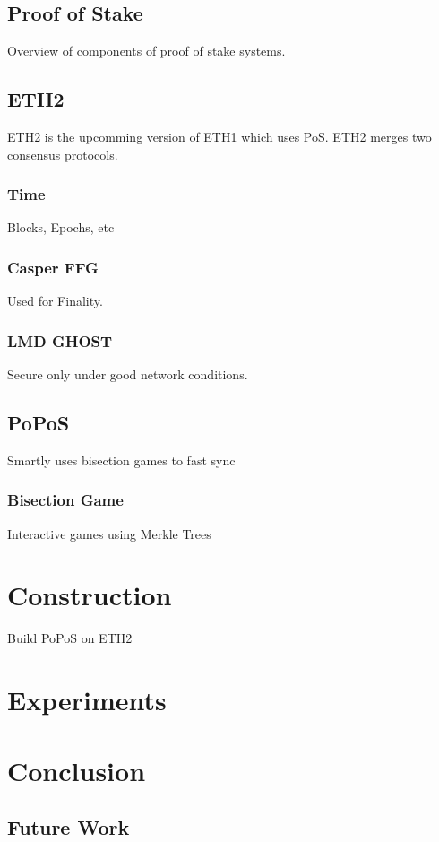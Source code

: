 \documentclass[runningheads]{llncs}
\begin{document}
\subsection{Proof of Stake}
Overview of components of proof of stake systems.

\subsection{ETH2}
ETH2 is the upcomming version of ETH1 which uses PoS. ETH2 merges two consensus protocols.
\subsubsection{Time}
Blocks, Epochs, etc
\subsubsection{Casper FFG}
Used for Finality. \cite{CasperFFG}

\subsubsection{LMD GHOST}
Secure only under good network conditions. \cite{Gasper}

\subsection{PoPoS}
Smartly uses bisection games to fast sync \cite{PoPos}

\subsubsection{Bisection Game}
Interactive games using Merkle Trees

\section{Construction}
Build PoPoS on ETH2 

\section{Experiments}
\section{Conclusion}
\subsection{Future Work}



\end{document}
